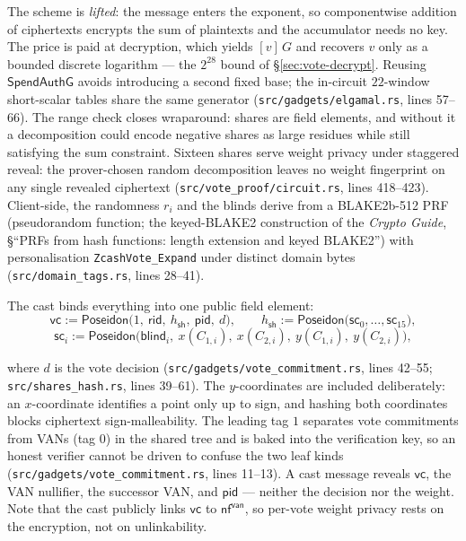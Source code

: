 \documentclass[11pt,a4paper]{article}
\theoremstyle{definition}
\newcommand{\nfsym}{\mathsf{nf}}
\begin{document}
The scheme is \emph{lifted}: the message enters the exponent, so
componentwise addition of ciphertexts encrypts the sum of plaintexts and the
accumulator needs no key. The price is paid at decryption, which yields
$[v]\,G$ and recovers $v$ only as a bounded discrete logarithm --- the
$2^{28}$ bound of \S\ref{sec:vote-decrypt}. Reusing $\mathsf{SpendAuthG}$
avoids introducing a second fixed base; the in-circuit $22$-window
short-scalar tables share the same generator
(\texttt{src/gadgets/elgamal.rs}, lines 57--66). The range check closes
wraparound: shares are field elements, and without it a decomposition could
encode negative shares as large residues while still satisfying the sum
constraint. Sixteen shares serve weight privacy under staggered reveal: the
prover-chosen random decomposition leaves no weight fingerprint on any
single revealed ciphertext (\texttt{src/vote\_proof/circuit.rs}, lines
418--423). Client-side, the randomness $r_i$ and the blinds derive from a
BLAKE2b-512 PRF (pseudorandom function; the keyed-BLAKE2 construction of
the \emph{Crypto Guide}, \S``PRFs from hash functions: length extension
and keyed BLAKE2'') with personalisation \texttt{ZcashVote\_Expand} under
distinct domain bytes (\texttt{src/domain\_tags.rs}, lines 28--41).

The cast binds everything into one public field element:
\[
\mathsf{vc} := \mathsf{Poseidon}\bigl(1,\ \mathsf{rid},\
h_{\mathsf{sh}},\ \mathsf{pid},\ d\bigr), \qquad
h_{\mathsf{sh}} := \mathsf{Poseidon}\bigl(\mathsf{sc}_0, \ldots,
\mathsf{sc}_{15}\bigr),
\]
\[
\mathsf{sc}_i := \mathsf{Poseidon}\bigl(\mathsf{blind}_i,\ x(C_{1,i}),\
x(C_{2,i}),\ y(C_{1,i}),\ y(C_{2,i})\bigr),
\]
\begin{sloppypar}
where $d$ is the vote decision (\texttt{src/gadgets/vote\_commitment.rs},
lines 42--55; \texttt{src/shares\_hash.rs}, lines 39--61). The
$y$-coordinates are included deliberately: an $x$-coordinate identifies a
point only up to sign, and hashing both coordinates blocks ciphertext
sign-malleability. The leading tag $1$ separates vote commitments from VANs
(tag $0$) in the shared tree and is baked into the verification key, so an
honest verifier cannot be driven to confuse the two leaf kinds
(\texttt{src/gadgets/vote\_commitment.rs}, lines 11--13). A cast message
reveals $\mathsf{vc}$, the VAN nullifier, the successor VAN, and
$\mathsf{pid}$ --- neither the decision nor the weight. Note that the cast
publicly links $\mathsf{vc}$ to $\nfsym^{\mathsf{van}}$, so per-vote weight
privacy rests on the encryption, not on unlinkability.
\end{sloppypar}
\end{document}
